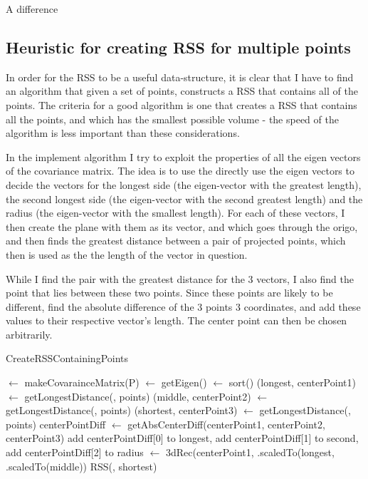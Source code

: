 A difference 

\subsection{Heuristic for creating RSS for multiple points}
In order for the RSS to be a useful data-structure, it is clear that I have to find an algorithm that given a set of points, constructs a RSS that contains all of the points. The criteria for a good algorithm is one that creates a RSS that contains all the points, and which has the smallest possible volume - the speed of the algorithm is less important than these considerations.

In the implement algorithm I try to exploit the properties of all the eigen vectors of the covariance matrix. The idea is to use the directly use the eigen vectors to decide the vectors for the longest side (the eigen-vector with the greatest length), the second longest side (the eigen-vector with the second greatest length) and the radius (the eigen-vector with the smallest length). For each of these vectors, I then create the plane with them as its vector, and which goes through the origo, and then finds the greatest distance between a pair of projected points, which then is used as the the length of the vector in question.

While I find the pair with the greatest distance for the 3 vectors, I also find the point that lies between these two points. Since these points are likely to be different, find the absolute difference of the 3 points 3 coordinates, and add these values to their respective vector's length. The center point can then be chosen arbitrarily.

\begin{algorithm}[H]
  \caption{CreateRSSContainingPoints}
  \label{create-algo}
   
  \dontprintsemicolon
  \covar $\gets$ makeCovarainceMatrix(P)\;
  \eigen $\gets$ getEigen(\covar) \;
  \eigen $\gets$ sort(\eigen) \;
  (longest, centerPoint1) $\gets$ getLongestDistance(\eigen[2], points) \;
  (middle, centerPoint2) $\gets$ getLongestDistance(\eigen[1], points) \;
  (shortest, centerPoint3) $\gets$ getLongestDistance(\eigen[0], points) \;
  centerPointDiff $\gets$ getAbsCenterDiff(centerPoint1, centerPoint2, centerPoint3) \;
  add centerPointDiff[0] to longest, add centerPointDiff[1] to second, add centerPointDiff[2] to radius \;
  \threedeeRec $\gets$ 3dRec(centerPoint1, \eigen[2].scaledTo(longest, \eigen[1].scaledTo(middle)) \;
  \return RSS(\threedeeRec, shortest) \;
\end{algorithm}

